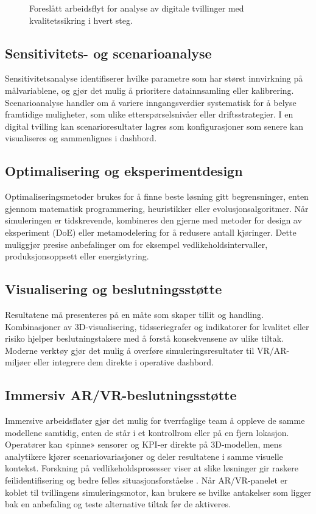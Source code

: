 \begin{figure}[htbp]
    \centering
    \caption{Foreslått arbeidsflyt for analyse av digitale tvillinger med kvalitetssikring i hvert steg.}
    \label{fig:kap04-analyseflyt}
\end{figure}

\subsection{Sensitivitets- og scenarioanalyse}
Sensitivitetsanalyse identifiserer hvilke parametre som har størst innvirkning på målvariablene, og gjør det mulig å prioritere datainnsamling eller kalibrering. Scenarioanalyse handler om å variere inngangsverdier systematisk for å belyse framtidige muligheter, som ulike etterspørselsnivåer eller driftsstrategier. I en digital tvilling kan scenarioresultater lagres som konfigurasjoner som senere kan visualiseres og sammenlignes i dashbord.

\subsection{Optimalisering og eksperimentdesign}
Optimaliseringsmetoder brukes for å finne beste løsning gitt begrensninger, enten gjennom matematisk programmering, heuristikker eller evolusjonsalgoritmer. Når simuleringen er tidskrevende, kombineres den gjerne med metoder for design av eksperiment (DoE) eller metamodelering for å redusere antall kjøringer. Dette muliggjør presise anbefalinger om for eksempel vedlikeholdsintervaller, produksjonsoppsett eller energistyring.

\subsection{Visualisering og beslutningsstøtte}
Resultatene må presenteres på en måte som skaper tillit og handling. Kombinasjoner av 3D-visualisering, tidsseriegrafer og indikatorer for kvalitet eller risiko hjelper beslutningstakere med å forstå konsekvensene av ulike tiltak. Moderne verktøy gjør det mulig å overføre simuleringsresultater til VR/AR-miljøer eller integrere dem direkte i operative dashbord.

\subsection{Immersiv AR/VR-beslutningsstøtte}
Immersive arbeidsflater gjør det mulig for tverrfaglige team å oppleve de samme modellene samtidig, enten de står i et kontrollrom eller på en fjern lokasjon. Operatører kan «pinne» sensorer og KPI-er direkte på 3D-modellen, mens analytikere kjører scenariovariasjoner og deler resultatene i samme visuelle kontekst. Forskning på vedlikeholdsprosesser viser at slike løsninger gir raskere feilidentifisering og bedre felles situasjonsforståelse \citep{palmarini2018augmented}. Når AR/VR-panelet er koblet til tvillingens simuleringsmotor, kan brukere se hvilke antakelser som ligger bak en anbefaling og teste alternative tiltak før de aktiveres.

